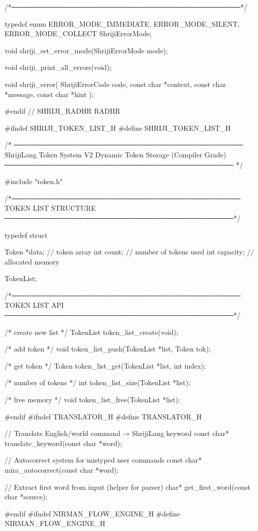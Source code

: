 \documentclass{article}
\begin{document}
/*──────────────────────────────────────────────*/

typedef enum {
    ERROR_MODE_IMMEDIATE,
    ERROR_MODE_SILENT,
    ERROR_MODE_COLLECT
} ShrijiErrorMode;

void shriji_set_error_mode(ShrijiErrorMode mode);

void shriji_print_all_errors(void);

void shriji_error(
    ShrijiErrorCode code,
    const char *context,
    const char *message,
    const char *hint
);

#endif
// SHRIJI_RADHR RADHR

#ifndef SHRIJI_TOKEN_LIST_H
#define SHRIJI_TOKEN_LIST_H

/*
──────────────────────────────────────────────
 ShrijiLang Token System V2
 Dynamic Token Storage (Compiler Grade)
──────────────────────────────────────────────
*/

#include "token.h"

/*──────────────────────────────────────────────
  TOKEN LIST STRUCTURE
──────────────────────────────────────────────*/

typedef struct
{
    Token *data;      // token array
    int count;        // number of tokens used
    int capacity;     // allocated memory

} TokenList;


/*──────────────────────────────────────────────
  TOKEN LIST API
──────────────────────────────────────────────*/

/* create new list */
TokenList token_list_create(void);

/* add token */
void token_list_push(TokenList *list, Token tok);

/* get token */
Token token_list_get(TokenList *list, int index);

/* number of tokens */
int token_list_size(TokenList *list);

/* free memory */
void token_list_free(TokenList *list);


#endif
#ifndef TRANSLATOR_H
#define TRANSLATOR_H

// Translate English/world command → ShrijiLang keyword
const char* translate_keyword(const char *word);

// Autocorrect system for mistyped user commands
const char* mira_autocorrect(const char *word);

// Extract first word from input (helper for parser)
char* get_first_word(const char *source);

#endif
#ifndef NIRMAN_FLOW_ENGINE_H
#define NIRMAN_FLOW_ENGINE_H
\end{document}
